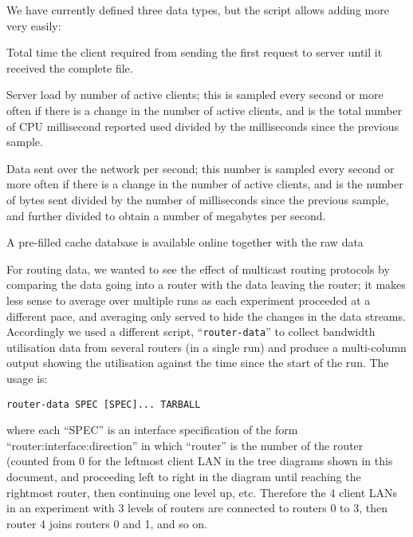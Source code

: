 \documentclass[a4paper,11pt,twocolumn]{article}
\begin{document}
We have currently defined three data types, but the script allows adding more
very easily:

\begin{list}{server-load:}{}
\item[run-time:]
Total time the client required from sending the first request to server
until it received the complete file.
\item[server-load:]
Server load by number of active clients; this is sampled every second
or more often if there is a change in the number of active clients,
and is the total number of CPU millisecond reported used divided by
the milliseconds since the previous sample.
\item[server-tx:]
Data sent over the network per second; this number is sampled every
second or more often if there is a change in the number of active
clients, and is the number of bytes sent divided by the number of
milliseconds since the previous sample, and further divided to
obtain a number of megabytes per second.
\end{list}

A pre-filled cache database is available online together with the raw
data~\cite{data}

For routing data, we wanted to see the effect of multicast routing protocols
by comparing the data going into a router with the data leaving the router;
it makes less sense to average over multiple runs as each experiment proceeded
at a different pace, and averaging only served to hide the changes in the
data streams. Accordingly we used a different script, ``{\tt router-data}''
to collect bandwidth utilisation data from several routers (in a single run)
and produce a multi-column output showing the utilisation against the time
since the start of the run. The usage is:

\begin{verbatim}
router-data SPEC [SPEC]... TARBALL
\end{verbatim}

\noindent
where each ``SPEC'' is an interface specification of the form
``router:interface:direction'' in which ``router'' is the number of
the router (counted from 0 for the leftmost client LAN in the tree diagrams
shown in this document, and proceeding left to right in the diagram until
reaching the rightmost router, then continuing one level up, etc.  Therefore
the 4 client LANs in an experiment with 3 levels of routers are connected
to routers 0 to 3, then router 4 joins routers 0 and 1, and so on.
\end{document}
